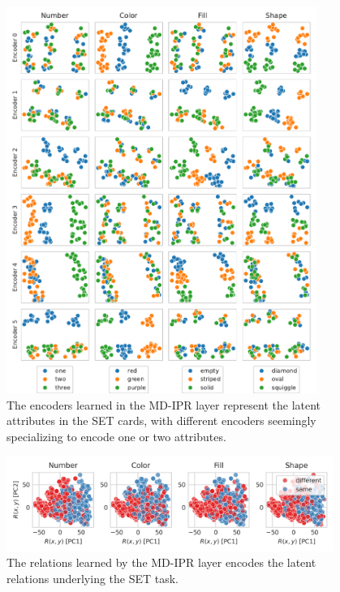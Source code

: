 \begin{figure}[H]
    \centering
    \includegraphics[width=0.9\textwidth]{figs/representation_analysis/mdipr_encoders_rep.pdf}
    \caption{The encoders learned in the MD-IPR layer represent the latent attributes in the SET cards, with different encoders seemingly specializing to encode one or two attributes.}\label{fig:mdirp_encoders_rep}
\end{figure}

\begin{figure}[H]
    \centering
    \includegraphics[width=0.95\textwidth]{figs/representation_analysis/mdipr_rel_rep.png}
    \caption{The relations learned by the MD-IPR layer encodes the latent relations underlying the SET task.}\label{fig:mdipr_rel_rep}
\end{figure}

